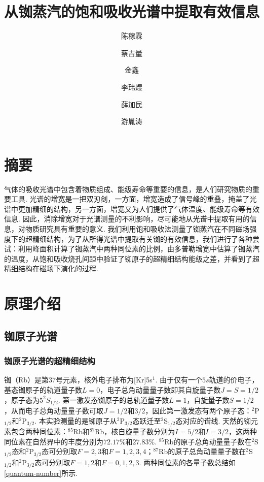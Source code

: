\documentclass[UTF8,a4paper,10pt]{article}
\title{从铷蒸汽的饱和吸收光谱中提取有效信息}
\author{陈稼霖\and 蔡吉量\and 金鑫\and 李玮煜\and 薛加民\and 游胤涛}
\begin{document}
\maketitle

\section{摘要}
    气体的吸收光谱中包含着物质组成、能级寿命等重要的信息，是人们研究物质的重要工具. 光谱的增宽是一把双刃剑，一方面，增宽造成了信号峰的重叠，掩盖了光谱中更加精细的结构，另一方面，增宽又为人们提供了气体温度、能级寿命等有效信息. 因此，消除增宽对于光谱测量的不利影响，尽可能地从光谱中提取有用的信息，对物质研究具有重要的意义. 我们利用饱和吸收法测量了铷蒸汽在不同磁场强度下的超精细结构，为了从所得光谱中提取有关铷的有效信息，我们进行了各种尝试：利用峰面积计算了铷蒸汽中两种同位素的比例，由多普勒增宽中估算了铷蒸汽的温度，从饱和吸收烧孔间距中验证了铷原子的超精细结构能级之差，并看到了超精细结构在磁场下演化的过程.

\section{原理介绍}

\subsection{铷原子光谱}

\subsubsection{铷原子光谱的超精细结构}

铷（Rb）是第$37$号元素，核外电子排布为[Kr]5s$^1$. 由于仅有一个$5s$轨道的价电子，基态铷原子的轨道量子数$L=0$，电子总角动量量子数即其自旋量子数$J=S=1/2$，原子态为$5^2S_{1/2}$. 第一激发态铷原子的总轨道量子数$L=1$，自旋量子数$S=1/2$，从而电子总角动量量子数可取$J=1/2$和$3/2$，因此第一激发态有两个原子态：$^2$P$_{1/2}$和$^2$P$_{3/2}$. 本实验测量的是铷原子从$^2$P$_{3/2}$态跃迁至$^2$S$_{1/2}$态对应的谱线. 天然的铷元素包含两种同位素：$^{85}$Rb和$^{87}$Rb，核自旋量子数分别为$I=5/2$和$I=3/2$，这两种同位素在自然界中的丰度分别为$72.17\%$和$27.83\%$. $^{85}$Rb的原子总角动量量子数在$^2$S$_{1/2}$态和$^2$P$_{3/2}$态可分别取$F=2,3$和$F=1,2,3,4$；$^{87}$Rb的原子总角动量量子数在$^2$S$_{1/2}$和$^2$P$_{3/2}$态可分别取$F=1,2$和$F=0,1,2,3$. 两种同位素的各量子数总结如\ref{quantum-number}所示.
\end{document}
